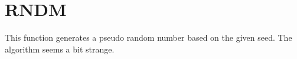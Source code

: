 \section{RNDM}
\label{sect:rndm}

\noindent This function generates a pseudo random number based on the given
seed. The algorithm seems a bit strange.\\
